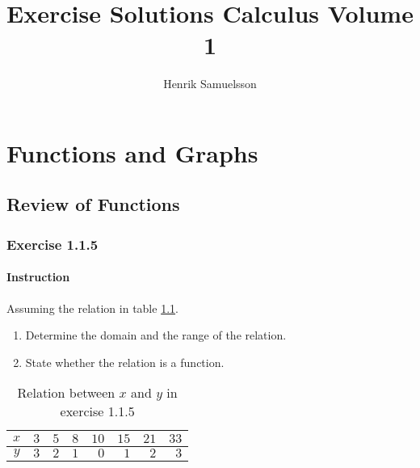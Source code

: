 \documentclass[11pt, letterpaper, oneside]{memoir}
\title{Exercise Solutions Calculus Volume 1}
\author{Henrik Samuelsson}
\begin{document}
\maketitle
\newpage
\tableofcontents

\chapter{Functions and Graphs}

\section{Review of Functions}













\subsection*{Exercise 1.1.5}

\subsubsection{Instruction}

Assuming the relation in table \ref{table:exercise-1.1.5}.

\begin{enumerate}[label=(\alph*)]
  \item Determine the domain and the range of the relation.
  \item State whether the relation is a function.
\end{enumerate}

\begin{table}[ht]
  \centering
  \begin{tabular}{ c | r r r r r r r }
    \hline
    $ x $ & $ 3 $ & $ 5 $ & $ 8 $ & $ 10 $ & $ 15 $ & $ 21 $ & $ 33 $ \\
    \hline
    $ y $ & $ 3 $ & $ 2 $ & $ 1 $ & $ 0 $ & $ 1 $ & $ 2 $ & $ 3 $ \\
    \hline
  \end{tabular}
  \caption{Relation between $ x $ and $ y $ in exercise 1.1.5}
  \label{table:exercise-1.1.5}
\end{table}
\end{document}
